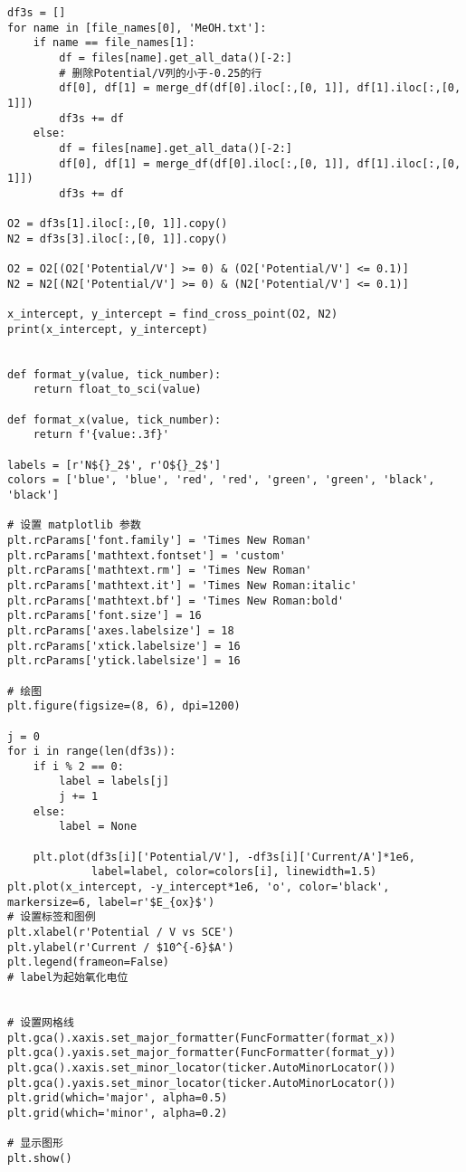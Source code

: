 \begin{verbatim}
df3s = []
for name in [file_names[0], 'MeOH.txt']:
    if name == file_names[1]:
        df = files[name].get_all_data()[-2:]
        # 删除Potential/V列的小于-0.25的行
        df[0], df[1] = merge_df(df[0].iloc[:,[0, 1]], df[1].iloc[:,[0, 1]])
        df3s += df
    else:
        df = files[name].get_all_data()[-2:]
        df[0], df[1] = merge_df(df[0].iloc[:,[0, 1]], df[1].iloc[:,[0, 1]])
        df3s += df

O2 = df3s[1].iloc[:,[0, 1]].copy()
N2 = df3s[3].iloc[:,[0, 1]].copy()

O2 = O2[(O2['Potential/V'] >= 0) & (O2['Potential/V'] <= 0.1)]
N2 = N2[(N2['Potential/V'] >= 0) & (N2['Potential/V'] <= 0.1)]

x_intercept, y_intercept = find_cross_point(O2, N2)
print(x_intercept, y_intercept)


def format_y(value, tick_number):
    return float_to_sci(value)

def format_x(value, tick_number):
    return f'{value:.3f}'

labels = [r'N${}_2$', r'O${}_2$']
colors = ['blue', 'blue', 'red', 'red', 'green', 'green', 'black', 'black']

# 设置 matplotlib 参数
plt.rcParams['font.family'] = 'Times New Roman'
plt.rcParams['mathtext.fontset'] = 'custom'
plt.rcParams['mathtext.rm'] = 'Times New Roman'
plt.rcParams['mathtext.it'] = 'Times New Roman:italic'
plt.rcParams['mathtext.bf'] = 'Times New Roman:bold'
plt.rcParams['font.size'] = 16
plt.rcParams['axes.labelsize'] = 18
plt.rcParams['xtick.labelsize'] = 16
plt.rcParams['ytick.labelsize'] = 16

# 绘图
plt.figure(figsize=(8, 6), dpi=1200)

j = 0
for i in range(len(df3s)):
    if i % 2 == 0:
        label = labels[j]
        j += 1
    else:
        label = None

    plt.plot(df3s[i]['Potential/V'], -df3s[i]['Current/A']*1e6, 
             label=label, color=colors[i], linewidth=1.5)
plt.plot(x_intercept, -y_intercept*1e6, 'o', color='black', markersize=6, label=r'$E_{ox}$')
# 设置标签和图例
plt.xlabel(r'Potential / V vs SCE')
plt.ylabel(r'Current / $10^{-6}$A')
plt.legend(frameon=False)
# label为起始氧化电位


# 设置网格线
plt.gca().xaxis.set_major_formatter(FuncFormatter(format_x))
plt.gca().yaxis.set_major_formatter(FuncFormatter(format_y))
plt.gca().xaxis.set_minor_locator(ticker.AutoMinorLocator())
plt.gca().yaxis.set_minor_locator(ticker.AutoMinorLocator())
plt.grid(which='major', alpha=0.5)
plt.grid(which='minor', alpha=0.2)

# 显示图形
plt.show()
\end{verbatim}

